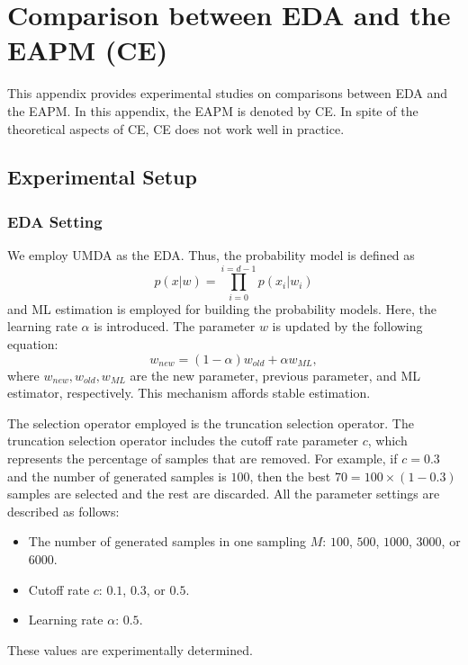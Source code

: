 \chapter{Comparison between EDA and the EAPM (CE)}
\label{exp-edace}
This appendix provides experimental studies on comparisons
between EDA and the EAPM.
In this appendix, the EAPM is denoted by CE.
In spite of the theoretical aspects of CE,
CE does not work well in practice.

\section{Experimental Setup}
\subsection{EDA Setting}
We employ UMDA
\cite{muhlenbein:umda} as the EDA.
Thus, the probability model is defined as
\begin{equation}
 p(x|w)=\prod_{i=0}^{i=d-1} p(x_i|w_i)
\end{equation}
and ML estimation is employed for building the probability models.
Here, the learning rate $\alpha$ is introduced.
The parameter $w$ is updated by the following equation:
\begin{equation}
 w_{new}=(1-\alpha) w_{old} + \alpha w_{ML},
\end{equation}
where $w_{new},w_{old},w_{ML}$ are the new parameter,
previous parameter, and ML estimator, respectively.
This mechanism affords stable estimation.

The selection operator employed is the truncation selection operator.
The truncation selection operator includes the cutoff rate parameter $c$,
which represents the percentage of samples that are removed.
For example, if $c=0.3$ and
the number of generated samples is $100$,
then the best $70=100 \times (1-0.3)$ samples are selected
and the rest are discarded.
All the parameter settings are described as follows:
\begin{itemize}
 \item The number of generated samples in one sampling $M$: $100$, $500$,
$1000$, $3000$, or $6000$.
 \item Cutoff rate $c$: $0.1$, $0.3$, or $0.5$.
 \item Learning rate $\alpha$: $0.5$.
\end{itemize}
These values are experimentally determined.


